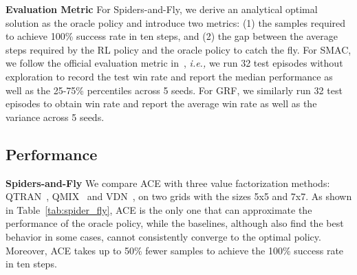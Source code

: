 \documentclass[letterpaper]{article} \usepackage{aaai23}  \usepackage{times}  \usepackage{helvet}  \usepackage{courier}  \usepackage[hyphens]{url}  \usepackage{graphicx} \urlstyle{rm} \def\UrlFont{\rm}  \usepackage{natbib}  \usepackage{caption} \frenchspacing  \setlength{\pdfpagewidth}{8.5in} \setlength{\pdfpageheight}{11in} \usepackage{algorithm}
\begin{document}
\textbf{Evaluation Metric}
For Spiders-and-Fly, we derive an analytical optimal solution as the oracle policy and introduce two metrics: (1) the samples required to achieve 100\% success rate in ten steps, and (2) the gap between the average steps required by the RL policy and the oracle policy to catch the fly.
For SMAC, we follow the official evaluation metric in~\citeyear{smac}, \textit{i.e.,} we run 32 test episodes without exploration to record the test win rate and report the median performance as well as the 25-75\% percentiles across 5 seeds. For GRF, we similarly run 32 test episodes to obtain win rate and report the average win rate as well as the variance across 5 seeds. 

\vspace{-1ex}
\begin{table}[t!]
    \centering
    \vspace{-1ex}
    \caption{Comparison ACE against baselines on Spiders-and-Fly. Steps represent the gap between the average steps of the methods and the oracle policy. Samples represent the number of samples to achieve a 100\% success rate within 10 steps.}
    \label{tab:spider_fly}
\vspace{-4ex}
\end{table}



\subsection{Performance}
\vspace{-1ex}

\textbf{Spiders-and-Fly} 
We compare ACE with three value factorization methods: QTRAN~\citeyear{qtran}, QMIX~\citeyear{qmix} and VDN~\citeyear{vdn}, on two grids with the sizes 5x5 and 7x7. 
As shown in Table~\ref{tab:spider_fly}, ACE is the only one that can approximate the performance of the oracle policy, while the baselines, although also find the best behavior in some cases, cannot consistently converge to the optimal policy. 
Moreover, ACE takes up to 50\% fewer samples to achieve the 100\% success rate in ten steps.
\end{document}
